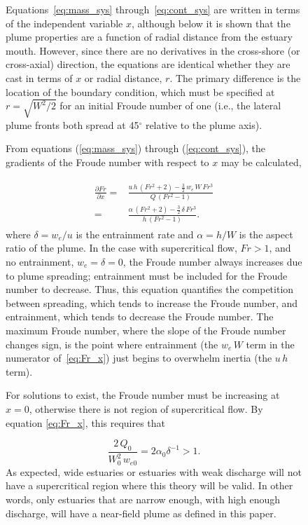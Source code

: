 \documentclass[11pt]{report}
\numberwithin{equation}{section}
\begin{document}
\begin{figure}
Equations~\ref{eq:mass_sys} through~\ref{eq:cont_sys} are written in terms of the independent variable $x$, although below it is shown that the plume properties are a function of radial distance from the estuary mouth.  However, since there are no derivatives in the cross-shore (or cross-axial) direction, the equations are identical whether they are cast in terms of $x$ or radial distance, $r$.  The primary difference is the location of the boundary condition, which must be specified at $r = \sqrt{W^2 / 2}$ for an initial Froude number of one (i.e., the lateral plume fronts both spread at 45$^\circ{}$ relative to the plume axis).

From equations (\ref{eq:mass_sys}) through (\ref{eq:cont_sys}), the gradients of the Froude number with respect to $x$ may be calculated,

\begin{align}
\begin{split}
\frac{\partial Fr}{\partial x} 
=& \frac{ u\,h\,(Fr^2+2) - \frac{3}{2}\,w_e\,W\,Fr^3}{ Q\,(Fr^2-1)} \\
=& \frac{ \alpha\,(Fr^2+2) - \frac{3}{2}\,\delta\,Fr^3}{ h\,(Fr^2-1)}.
\end{split}
\label{eq:Fr_x}
\end{align}
where $\delta = w_e/u$ is the entrainment rate and $\alpha = h/W$ is the aspect ratio of the plume.  In the case with supercritical flow, $Fr>1$, and no entrainment, $w_e=\delta=0$, the Froude number always increases due to plume spreading; entrainment must be included for the Froude number to decrease.  Thus, this equation quantifies the competition between spreading, which tends to increase the Froude number, and entrainment, which tends to decrease the Froude number.  The maximum Froude number, where the slope of the Froude number changes sign, is the point where entrainment (the $w_e\,W$ term in the numerator of~\ref{eq:Fr_x}) just begins to overwhelm inertia (the $u\,h$ term).

For solutions to exist, the Froude number must be increasing at $x=0$, otherwise there is not region of supercritical flow.  By equation  \ref{eq:Fr_x}, this requires that

\begin{equation}
  \frac{2\,Q_0}{W_0^2\,w_{e0}} = 2\alpha_0\delta^{-1} > 1.
\end{equation}
As expected, wide estuaries or estuaries with weak discharge will not have a supercritical region where this theory will be valid.  In other words, only estuaries that are narrow enough, with high enough discharge, will have a near-field plume as defined in this paper.


\end{figure}
\end{document}
